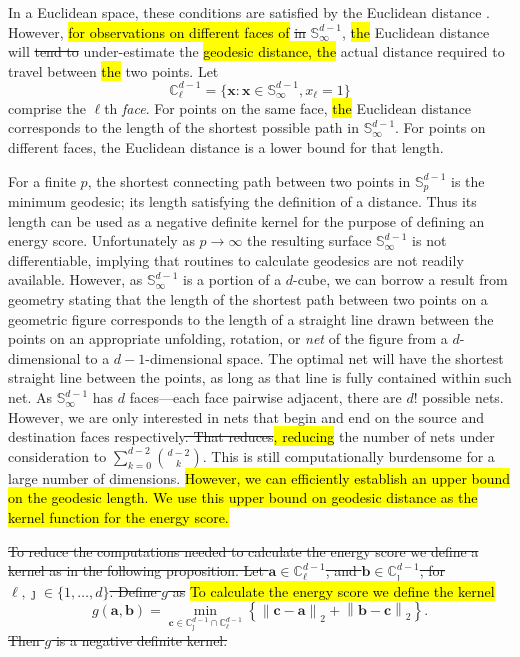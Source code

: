 \documentclass[iicol,sn-basic]{sn-jnl}
\newcommand{\norm}[1]{\left\lVert #1 \right\rVert}
\newcommand{\pnorm}[2]{\norm{#1}_{#2}}
\theoremstyle{thmstyleone}
\begin{document}
In a Euclidean space, these conditions are satisfied by the Euclidean distance \hl{\mbox{\citep{berg1984}}}. However, \hl{for observations on different faces of }\st{in } ${\mathbb S}_{\infty}^{d-1}$, \hl{the }Euclidean distance will \st{tend to} under-estimate the \hl{geodesic distance, the }actual distance required to travel between \hl{the }two points.  Let
\begin{equation*}
{\mathbb C}_{\ell}^{d-1} = \lbrace \bm{x} : \bm{x} \in {\mathbb S}_{\infty}^{d-1}, x_{\ell} = 1\rbrace
\end{equation*}
comprise the $\ell$th \emph{face}.  For points on the same face, \hl{the }Euclidean distance corresponds to the length of the shortest possible path in ${\mathbb S}_{\infty}^{d-1}$.  For points on different faces, the Euclidean distance is a lower bound for that length.

For a finite $p$, the shortest connecting path between two points in ${\mathbb S}_p^{d-1}$ is the minimum geodesic; its length satisfying the definition of a distance.  Thus its length can be used as a negative definite kernel for the purpose of defining an energy score. Unfortunately as $p\to\infty$ the resulting surface ${\mathbb S}_{\infty}^{d-1}$ is not differentiable, implying that routines to calculate geodesics are not readily available.  However, as ${\mathbb S}_{\infty}^{d-1}$ is a portion of a $d$-cube, we can borrow a result from geometry \citep{pappas1989} stating that the length of the shortest path between two points on a geometric figure corresponds to the length of a straight line drawn between the points on an appropriate unfolding, rotation, or \emph{net} of the figure from a $d$-dimensional to a $d-1$-dimensional space.  The optimal net will have the shortest straight line between the points, as long as that line is fully contained within such net. As ${\mathbb S}_{\infty}^{d-1}$ has $d$ faces---each face pairwise adjacent, there are $d!$ possible nets.  However, we are only interested in nets that begin and end on the source and destination faces respectively\st{.  That reduces}\hl{, reducing} the number of nets under consideration to $\sum_{k = 0}^{d-2}\binom{d-2}{k}$.  This is still computationally burdensome for a large number of dimensions.\hl{  However, we can efficiently establish an upper bound on the geodesic length.  We use this upper bound on geodesic distance as the kernel function for the energy score.}

\st{To reduce the computations needed to calculate the energy score we define a kernel as in the following proposition.  Let $\bm{a} \in {\mathbb C}_{\ell}^{d-1}$, and $\bm{b} \in {\mathbb C}_{\jmath}^{d-1}$, for $\ell, \jmath \in \{1, \ldots , d\}$. Define $g$ as}
\hl{To calculate the energy score we define the kernel}
\[
g(\bm{a},\bm{b}) = \min_{\bm{c} \in{\mathbb C}_{\jmath}^{d-1}\cap{\mathbb C}_{\ell}^{d-1}}\left\{
\pnorm{\bm{c}-\bm{a}}{2} + \pnorm{\bm{b}-\bm{c}}{2} \right\}.
\]
\st{Then $g$  is a negative definite kernel.}
\end{document}
